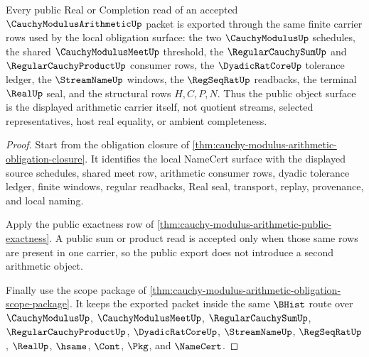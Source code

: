 \begin{theorem}
\label{thm:cauchy-modulus-arithmetic-public-export}
Every public Real or Completion read of an accepted $\CauchyModulusArithmeticUp$ packet is exported through the same finite carrier rows used by the local obligation surface: the two $\CauchyModulusUp$ schedules, the shared $\CauchyModulusMeetUp$ threshold, the $\RegularCauchySumUp$ and $\RegularCauchyProductUp$ consumer rows, the $\DyadicRatCoreUp$ tolerance ledger, the $\StreamNameUp$ windows, the $\RegSeqRatUp$ readbacks, the terminal $\RealUp$ seal, and the structural rows $H,C,P,N$. Thus the public object surface is the displayed arithmetic carrier itself, not quotient streams, selected representatives, host real equality, or ambient completeness.
\end{theorem}
\begin{proof}
Start from the obligation closure of \autoref{thm:cauchy-modulus-arithmetic-obligation-closure}. It identifies the local NameCert surface with the displayed source schedules, shared meet row, arithmetic consumer rows, dyadic tolerance ledger, finite windows, regular readbacks, Real seal, transport, replay, provenance, and local naming.

Apply the public exactness row of \autoref{thm:cauchy-modulus-arithmetic-public-exactness}. A public sum or product read is accepted only when those same rows are present in one carrier, so the public export does not introduce a second arithmetic object.

Finally use the scope package of \autoref{thm:cauchy-modulus-arithmetic-obligation-scope-package}. It keeps the exported packet inside the same $\BHist$ route over $\CauchyModulusUp$, $\CauchyModulusMeetUp$, $\RegularCauchySumUp$, $\RegularCauchyProductUp$, $\DyadicRatCoreUp$, $\StreamNameUp$, $\RegSeqRatUp$, $\RealUp$, $\hsame$, $\Cont$, $\Pkg$, and $\NameCert$.
\end{proof}


